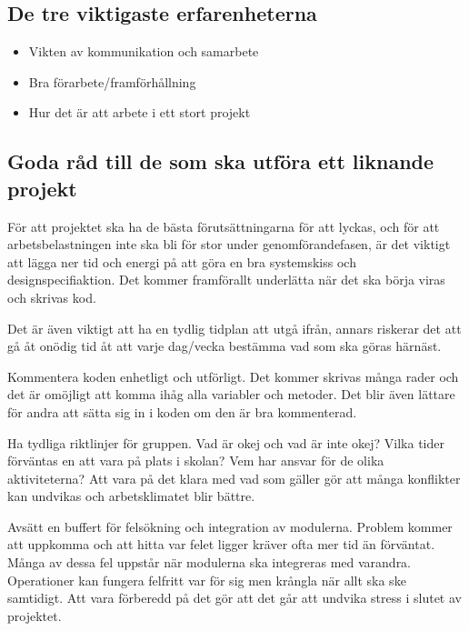 \documentclass[11pt]{article}
\begin{document}
\subsection{De tre viktigaste erfarenheterna}
\begin{itemize}
\item Vikten av kommunikation och samarbete
\item Bra förarbete/framförhållning
\item Hur det är att arbete i ett stort projekt
\end{itemize} 

\subsection{Goda råd till de som ska utföra ett liknande projekt}
För att projektet ska ha de bästa förutsättningarna för att lyckas, och för att arbetsbelastningen inte ska bli för stor under genomförandefasen, är det viktigt att lägga ner tid och energi på att göra en bra systemskiss och designspecifiaktion. Det kommer framförallt underlätta när det ska börja viras och skrivas kod. 

Det är även viktigt att ha en tydlig tidplan att utgå ifrån, annars riskerar det att gå åt onödig tid åt att varje dag/vecka bestämma vad som ska göras härnäst.

Kommentera koden enhetligt och utförligt. Det kommer skrivas många rader och det är omöjligt att komma ihåg alla variabler och metoder. Det blir även lättare för andra att sätta sig in i koden om den är bra kommenterad. 

Ha tydliga riktlinjer för gruppen. Vad är okej och vad är inte okej? Vilka tider förväntas en att vara på plats i skolan? Vem har ansvar för de olika aktiviteterna? Att vara på det klara med vad som gäller gör att många konflikter kan undvikas och arbetsklimatet blir bättre.

Avsätt en buffert för felsökning och integration av modulerna. Problem kommer att uppkomma och att hitta var felet ligger kräver ofta mer tid än förväntat. Många av dessa fel uppstår när modulerna ska integreras med varandra. Operationer kan fungera felfritt var för sig men krångla när allt ska ske samtidigt. Att vara förberedd på det gör att det går att undvika stress i slutet av projektet. 
\end{document}

